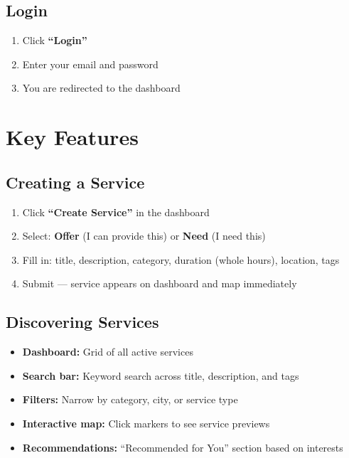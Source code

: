 \documentclass[11pt,a4paper]{report}
\begin{document}
\subsection{Login}

\begin{enumerate}
    \item Click \textbf{``Login''}
    \item Enter your email and password
    \item You are redirected to the dashboard
\end{enumerate}

\section{Key Features}

\subsection{Creating a Service}

\begin{enumerate}
    \item Click \textbf{``Create Service''} in the dashboard
    \item Select: \textbf{Offer} (I can provide this) or \textbf{Need} (I need this)
    \item Fill in: title, description, category, duration (whole hours), location, tags
    \item Submit --- service appears on dashboard and map immediately
\end{enumerate}

\subsection{Discovering Services}

\begin{itemize}
    \item \textbf{Dashboard:} Grid of all active services
    \item \textbf{Search bar:} Keyword search across title, description, and tags
    \item \textbf{Filters:} Narrow by category, city, or service type
    \item \textbf{Interactive map:} Click markers to see service previews
    \item \textbf{Recommendations:} ``Recommended for You'' section based on interests
\end{itemize}
\end{document}
